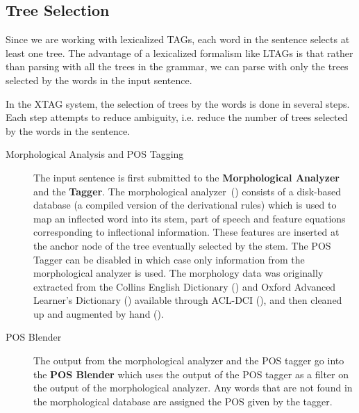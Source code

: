 \subsection{Tree Selection}

Since we are working with lexicalized TAGs, each word in the sentence
selects at least one tree. The advantage of a lexicalized formalism
like LTAGs is that rather than parsing with all the trees in the
grammar, we can parse with only the trees selected by the words in the
input sentence.

In the XTAG system, the selection of trees by the words is done in
several steps. Each step attempts to reduce ambiguity, i.e. reduce the
number of trees selected by the words in the sentence.

\begin{description}
\item[Morphological Analysis and POS Tagging] The input sentence is
  first submitted to the {\bf Morphological Analyzer} and the {\bf
    Tagger}. The morphological analyzer~(\cite{karp92}) consists of a
  disk-based database (a compiled version of the derivational rules)
  which is used to map an inflected word into its stem, part of speech
  and feature equations corresponding to inflectional information.
  These features are inserted at the anchor node of the tree
  eventually selected by the stem. The POS Tagger can be disabled in
  which case only information from the morphological analyzer is used.
  The morphology data was originally extracted from the Collins
  English Dictionary (\cite{ced79}) and Oxford Advanced Learner's
  Dictionary (\cite{oald74}) available through ACL-DCI
  (\cite{liberman89}), and then cleaned up and augmented by hand
  (\cite{karp92}).
    
\item[POS Blender] The output from the morphological analyzer and the
  POS tagger go into the {\bf POS Blender} which uses the output of
  the POS tagger as a filter on the output of the morphological
  analyzer. Any words that are not found in the morphological database
  are assigned the POS given by the tagger.
  

\end{description}
